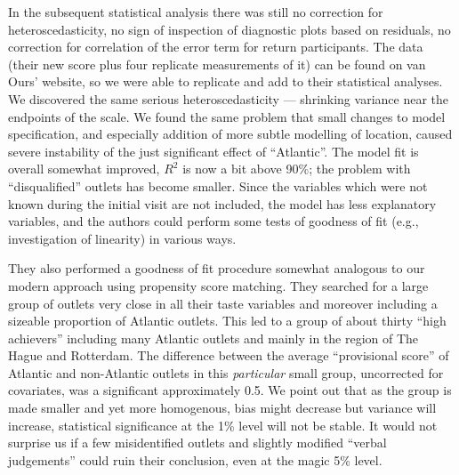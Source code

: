 \documentclass[alpha-refs]{wiley-article}
\begin{document}
In the subsequent statistical analysis there was still no correction for heteroscedasticity, no sign of inspection of diagnostic plots based on residuals, no correction for correlation of the error term for return participants. The data (their new score plus four replicate measurements of it) can be found on van Ours' website, so we were able to replicate and add to their statistical analyses.
We discovered the same serious heteroscedasticity --- shrinking variance near the endpoints of the scale. We found the same problem that small changes to model specification, and especially addition of more subtle modelling of location, caused severe instability of the just significant effect of  ``Atlantic''. The model fit is overall somewhat improved, $R^2$ is now a bit above 90\%; the problem with ``disqualified'' outlets has become smaller. Since the variables which were not known during the initial visit are not included, the model has less explanatory variables, and the authors could perform some tests of goodness of fit (e.g., investigation of linearity) in various ways. 

They also performed a goodness of fit procedure somewhat analogous to our modern approach using propensity score matching. They searched for a large group of outlets very close in all their taste variables and moreover including a sizeable proportion of Atlantic outlets. This led to a group of about thirty ``high achievers'' including many Atlantic outlets and mainly in the region of The Hague and Rotterdam.  The difference between the average ``provisional score''  of Atlantic and non-Atlantic outlets in this \emph{particular} small group, uncorrected for covariates, was a significant approximately 0.5.  We point out that as the group is made smaller and yet more homogenous, bias might decrease but variance will increase, statistical significance at the 1\% level will not be stable.  It would not surprise us if a few misidentified outlets and slightly modified ``verbal judgements'' could ruin their conclusion, even at the magic 5\% level. %
\end{document}
